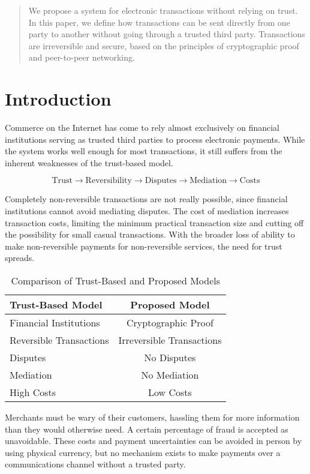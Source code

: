 \documentclass{article}
\begin{document}
\begin{abstract}
We propose a system for electronic transactions without relying on trust. In this paper, we define how transactions can be sent directly from one party to another without going through a trusted third party. Transactions are irreversible and secure, based on the principles of cryptographic proof and peer-to-peer networking.
\end{abstract}

\section{Introduction}
Commerce on the Internet has come to rely almost exclusively on financial institutions serving as trusted third parties to process electronic payments. While the system works well enough for most transactions, it still suffers from the inherent weaknesses of the trust-based model.

\begin{equation}
\text{Trust} \rightarrow \text{Reversibility} \rightarrow \text{Disputes} \rightarrow \text{Mediation} \rightarrow \text{Costs}
\end{equation}

Completely non-reversible transactions are not really possible, since financial institutions cannot avoid mediating disputes. The cost of mediation increases transaction costs, limiting the minimum practical transaction size and cutting off the possibility for small casual transactions. With the broader loss of ability to make non-reversible payments for non-reversible services, the need for trust spreads.

\begin{table}[h]
\centering
\begin{tabular}{|l|c|}
\hline
\textbf{Trust-Based Model} & \textbf{Proposed Model} \\ \hline
Financial Institutions & Cryptographic Proof \\ \hline
Reversible Transactions & Irreversible Transactions \\ \hline
Disputes & No Disputes \\ \hline
Mediation & No Mediation \\ \hline
High Costs & Low Costs \\ \hline
\end{tabular}
\caption{Comparison of Trust-Based and Proposed Models}
\end{table}

Merchants must be wary of their customers, hassling them for more information than they would otherwise need. A certain percentage of fraud is accepted as unavoidable. These costs and payment uncertainties can be avoided in person by using physical currency, but no mechanism exists to make payments over a communications channel without a trusted party.
\end{document}
